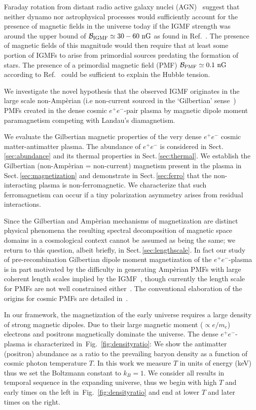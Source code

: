 \documentclass[aps,prd,floatfix,reprint]{revtex4-2}
\newcommand{\rf}[1]{Fig.~{\ref{#1}}}
\newcommand{\rsec}[1]{Sect.\,{\ref{#1}}}
\newcommand*{\xblue}{\color{blue}}
\begin{document}
Faraday rotation from distant radio active galaxy nuclei (AGN)~\cite{Pomakov:2022cem} suggest that neither dynamo nor astrophysical processes would sufficiently account for the presence of magnetic fields in the universe today if the IGMF strength was around the upper bound of ${\cal B}_{\rm IGMF}\simeq30-60{\rm\ nG}$ as found in Ref.~\cite{Vernstrom:2021hru}. The presence of magnetic fields of this magnitude would then require that at least some portion of IGMFs to arise from primordial sources predating the formation of stars. The presence of a primordial magnetic field (PMF) ${\cal B}_{\rm PMF}\simeq0.1{\rm\ nG}$ according to Ref.~\cite{Jedamzik:2020krr} could be sufficient to explain the Hubble tension.

We investigate the novel hypothesis that the observed IGMF originates in the large scale non-Amp{\`e}rian (i.e non-current sourced in the `Gilbertian' sense~\cite{Rafelski:2017hce}) PMFs created in the dense cosmic $e^{+}e^{-}$-pair plasma by magnetic dipole moment paramagnetism competing with Landau's diamagnetism.

{\xblue We evaluate the Gilbertian magnetic properties of the very dense $e^{+}e^{-}$ cosmic matter-antimatter plasma. The abundance of $e^{+}e^{-}$ is considered in \rsec{sec:abundance} and its thermal properties in \rsec{sec:thermal}. We establish the Gilbertian (non-Amp{\`e}rian = non-current) magnetism present in the plasma in \rsec{sec:magnetization} and demonstrate in \rsec{sec:ferro} that the non-interacting plasma is non-ferromagnetic. We characterize that such ferromagnetism can occur if a tiny polarization asymmetry arises from residual interactions.}

{\xblue Since the Gilbertian and Amp{\`e}rian mechanisms of magnetization are distinct physical phenomena the resulting spectral decomposition of magnetic space domains in a cosmological context cannot be assumed as being the same; we return to this question, albeit briefly, in \rsec{sec:lengthscale}.} In fact our study of pre-recombination Gilbertian dipole moment magnetization of the $e^{+}e^{-}$-plasma is in part motivated by the difficulty in generating Amp{\`e}rian PMFs with large coherent length scales implied by the IGMF~\cite{Giovannini:2022rrl}, though currently the length scale for PMFs are not well constrained either~\cite{AlvesBatista:2021sln}. The conventional elaboration of the origins for cosmic PMFs are detailed in~\cite{Gaensler:2004gk,Durrer:2013pga,AlvesBatista:2021sln}.

In our framework, the magnetization of the early universe requires a large density of strong magnetic dipoles. Due to their large magnetic moment ($\propto e/m_e$) electrons and positrons magnetically dominate the universe. The dense $e^{+}e^{-}$-plasma is characterized in~\rf{fig:densityratio}: We show the antimatter (positron) abundance as a ratio to the prevailing baryon density as a function of cosmic photon temperature $T$. In this work we measure $T$ in units of energy (keV) thus we set the Boltzmann constant to $k_{B}=1$. We consider all results in temporal sequence in the expanding universe, thus we begin with high $T$ and early times on the left in~\rf{fig:densityratio} and end at lower $T$ and later times on the right.
\end{document}
